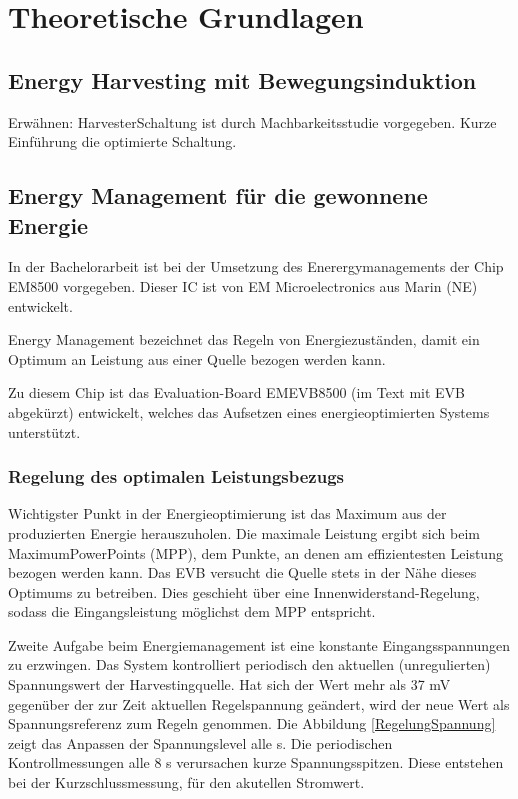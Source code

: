 \chapter{Theoretische Grundlagen}

\section{Energy Harvesting mit Bewegungsinduktion}
Erwähnen: HarvesterSchaltung ist durch Machbarkeitsstudie vorgegeben.
Kurze Einführung die optimierte Schaltung.





\section{Energy Management für die gewonnene Energie}
In der Bachelorarbeit ist bei der Umsetzung des Enerergymanagements der Chip EM8500 vorgegeben. Dieser IC ist von EM Microelectronics aus Marin (NE) entwickelt. %


Energy Management bezeichnet das Regeln von Energiezuständen, damit ein Optimum an Leistung aus einer Quelle bezogen werden kann.



Zu diesem Chip ist das Evaluation-Board EMEVB8500 (im Text mit EVB abgekürzt) entwickelt, welches das Aufsetzen eines energieoptimierten Systems unterstützt. 


\subsection{Regelung des optimalen Leistungsbezugs}

Wichtigster Punkt in der Energieoptimierung ist das Maximum aus der produzierten Energie herauszuholen. Die maximale Leistung ergibt sich beim MaximumPowerPoints (MPP), dem Punkte, an denen am effizientesten Leistung bezogen werden kann. 
Das EVB versucht die Quelle stets in der Nähe dieses Optimums zu betreiben. Dies geschieht über eine Innenwiderstand-Regelung, sodass die Eingangsleistung möglichst dem MPP entspricht.

Zweite Aufgabe beim Energiemanagement ist eine konstante Eingangsspannungen zu erzwingen. Das System kontrolliert periodisch den aktuellen (unregulierten) Spannungswert der Harvestingquelle. Hat sich der Wert mehr als 37 mV gegenüber der zur Zeit aktuellen Regelspannung geändert, wird der neue Wert als Spannungsreferenz zum Regeln genommen. Die Abbildung \ref{RegelungSpannung} zeigt das Anpassen der Spannungslevel alle s. Die periodischen Kontrollmessungen alle 8 s verursachen kurze Spannungsspitzen. Diese entstehen bei der Kurzschlussmessung, für den akutellen Stromwert.


